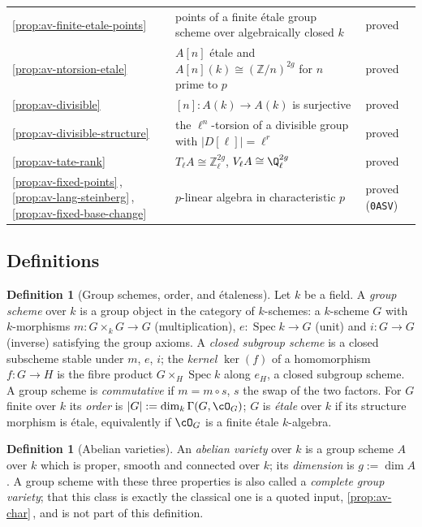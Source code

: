 \documentclass[11pt]{article}
\theoremstyle{plain}
\theoremstyle{definition}
\newtheorem{definition}[theorem]{Definition}
\newcommand{\Z}{\mathbb Z}
\DeclareMathOperator{\Spec}{Spec}
\newcommand{\Cref}[1]{\hyperref[#1]{\ref{#1}}\,\hyperref[#1]{\nameref*{#1}}}
\begin{document}
\begin{center}
\begin{tabular}{@{}>{\raggedright\arraybackslash}p{4.6cm}>{\raggedright\arraybackslash}p{6.4cm}>{\raggedright\arraybackslash}p{4.4cm}@{}}
\Cref{prop:av-finite-etale-points} & points of a finite \'etale group scheme over algebraically closed $k$ & proved \\
\Cref{prop:av-ntorsion-etale} & $A[n]$ \'etale and $A[n](k)\cong(\Z/n)^{2g}$ for $n$ prime to $p$ & proved \\
\Cref{prop:av-divisible} & $[n]:A(k)\to A(k)$ is surjective & proved \\
\Cref{prop:av-divisible-structure} & the $\ell^n$-torsion of a divisible group with $\lvert D[\ell]\rvert=\ell^r$ & proved \\
\Cref{prop:av-tate-rank} & $T_\ell A\cong\Z_\ell^{2g}$, $V_\ell A\cong\Q_\ell^{2g}$ & proved \\
\Cref{prop:av-fixed-points}, \Cref{prop:av-lang-steinberg}, \Cref{prop:av-fixed-base-change} & $p$-linear algebra in characteristic $p$ & proved (\texttt{0ASV}) \\
\hline
\end{tabular}
\end{center}

\subsection{Definitions}

\begin{definition}[Group schemes, order, and \'etaleness]
\label{def:av-group-scheme}
Let $k$ be a field.  A \emph{group scheme} over $k$ is a group object
in the category of $k$-schemes: a $k$-scheme $G$ with $k$-morphisms
$m:G\times_kG\to G$ (multiplication), $e:\Spec k\to G$ (unit) and
$i:G\to G$ (inverse) satisfying the group axioms.  A \emph{closed
subgroup scheme} is a closed subscheme stable under $m$, $e$, $i$;
the \emph{kernel} $\ker(f)$ of a homomorphism $f:G\to H$ is the fibre
product $G\times_H\Spec k$ along $e_H$, a closed subgroup scheme.  A
group scheme is \emph{commutative} if $m=m\circ s$, $s$ the swap of
the two factors.  For $G$ finite over $k$ its \emph{order} is
$\lvert G\rvert:=\dim_k\Gamma(G,\cO_G)$; $G$ is \emph{\'etale} over
$k$ if its structure morphism is \'etale, equivalently if $\cO_G$ is
a finite \'etale $k$-algebra.
\end{definition}

\begin{definition}[Abelian varieties]
\label{def:av}
An \emph{abelian variety} over $k$ is a group scheme $A$ over $k$
which is proper, smooth and connected over $k$; its \emph{dimension}
is $g:=\dim A$.  A group scheme with these three properties is also
called a \emph{complete group variety}; that this class is exactly the
classical one is a quoted input, \Cref{prop:av-char}, and is not part
of this definition.
\end{definition}
\end{document}
